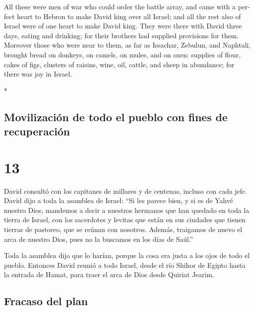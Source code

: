 \begin{paracol}{2}
\begin{otherlanguage}{english}
 All these were men of war who could order the battle
array, and came with a perfect heart to Hebron to make David king over
all Israel; and all the rest also of Israel were of one heart to make
David king.  They were there with David three days,
eating and drinking; for their brothers had supplied provisions for
them.  Moreover those who were near to them, as far as
Issachar, Zebulun, and Naphtali, brought bread on donkeys, on camels, on
mules, and on oxen: supplies of flour, cakes of figs, clusters of
raisins, wine, oil, cattle, and sheep in abundance; for there was joy in
Israel.

\end{otherlanguage}

\switchcolumn[0]*

\hypertarget{movilizaciuxf3n-de-todo-el-pueblo-con-fines-de-recuperaciuxf3n}{%
\subsection{Movilización de todo el pueblo con fines de
recuperación}\label{movilizaciuxf3n-de-todo-el-pueblo-con-fines-de-recuperaciuxf3n}}

\hypertarget{section-24}{%
\section{13}\label{section-24}}

 David consultó con los capitanes de millares y de
centenas, incluso con cada jefe.  David dijo a toda la
asamblea de Israel: ``Si les parece bien, y si es de Yahvé nuestro Dios,
mandemos a decir a nuestros hermanos que han quedado en toda la tierra
de Israel, con los sacerdotes y levitas que están en sus ciudades que
tienen tierras de pastoreo, que se reúnan con nosotros. 
Además, traigamos de nuevo el arca de nuestro Dios, pues no la buscamos
en los días de Saúl.''

 Toda la asamblea dijo que lo harían, porque la cosa era
justa a los ojos de todo el pueblo.  Entonces David reunió
a todo Israel, desde el río Shihor de Egipto hasta la entrada de Hamat,
para traer el arca de Dios desde Quiriat Jearim.

\hypertarget{fracaso-del-plan}{%
\subsection{Fracaso del plan}\label{fracaso-del-plan}}


\end{paracol}
